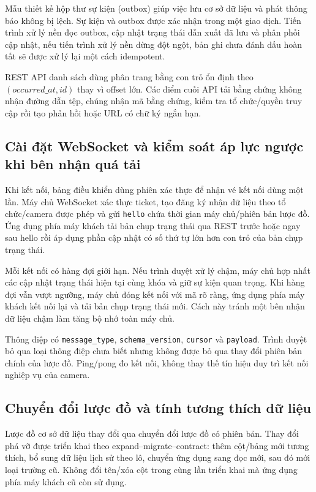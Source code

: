 Mẫu thiết kế hộp thư sự kiện (outbox) giúp việc lưu cơ sở dữ liệu và phát thông báo không bị lệch. Sự kiện và outbox được xác nhận trong một giao dịch. Tiến trình xử lý nền đọc outbox, cập nhật trạng thái dẫn xuất đã lưu và phân phối cập nhật, nếu tiến trình xử lý nền dừng đột ngột, bản ghi chưa đánh dấu hoàn tất sẽ được xử lý lại một cách idempotent.

REST API danh sách dùng phân trang bằng con trỏ ổn định theo $(occurred\_at,id)$ thay vì offset lớn. Các điểm cuối API tải bằng chứng không nhận đường dẫn tệp, chúng nhận mã bằng chứng, kiểm tra tổ chức/quyền truy cập rồi tạo phản hồi hoặc URL có chữ ký ngắn hạn.

\subsection{Cài đặt WebSocket và kiểm soát áp lực ngược khi bên nhận quá tải}
Khi kết nối, bảng điều khiển dùng phiên xác thực để nhận vé kết nối dùng một lần. Máy chủ WebSocket xác thực ticket, tạo đăng ký nhận dữ liệu theo tổ chức/camera được phép và gửi \texttt{hello} chứa thời gian máy chủ/phiên bản lược đồ. Ứng dụng phía máy khách tải bản chụp trạng thái qua REST trước hoặc ngay sau hello rồi áp dụng phần cập nhật có số thứ tự lớn hơn con trỏ của bản chụp trạng thái.

Mỗi kết nối có hàng đợi giới hạn. Nếu trình duyệt xử lý chậm, máy chủ hợp nhất các cập nhật trạng thái hiện tại cùng khóa và giữ sự kiện quan trọng. Khi hàng đợi vẫn vượt ngưỡng, máy chủ đóng kết nối với mã rõ ràng, ứng dụng phía máy khách kết nối lại và tải bản chụp trạng thái mới. Cách này tránh một bên nhận dữ liệu chậm làm tăng bộ nhớ toàn máy chủ.

Thông điệp có \texttt{message\_type}, \texttt{schema\_version}, \texttt{cursor} và \texttt{payload}. Trình duyệt bỏ qua loại thông điệp chưa biết nhưng không được bỏ qua thay đổi phiên bản chính của lược đồ. Ping/pong đo kết nối, không thay thế tín hiệu duy trì kết nối nghiệp vụ của camera.

\subsection{Chuyển đổi lược đồ và tính tương thích dữ liệu}
Lược đồ cơ sở dữ liệu thay đổi qua chuyển đổi lược đồ có phiên bản. Thay đổi phá vỡ được triển khai theo expand--migrate--contract: thêm cột/bảng mới tương thích, bổ sung dữ liệu lịch sử theo lô, chuyển ứng dụng sang đọc mới, sau đó mới loại trường cũ. Không đổi tên/xóa cột trong cùng lần triển khai mà ứng dụng phía máy khách cũ còn sử dụng.

